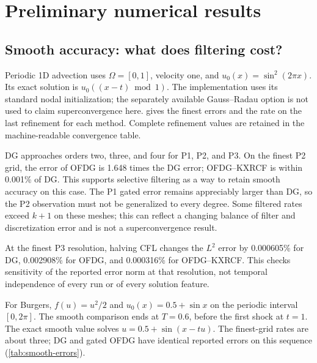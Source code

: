 \chapter{Preliminary numerical results}
\label{chap:experiments}


\section{Smooth accuracy: what does filtering cost?}
\label{sec:results-convergence-tables}
Periodic 1D advection uses $\Omega=[0,1]$, velocity one, and
$u_0(x)=\sin^2(2\pi x)$. Its exact solution is $u_0((x-t)\bmod1)$.
The implementation uses its standard nodal initialization; the separately
available Gauss--Radau option is not used to claim superconvergence here.
 gives the finest errors and the rate on the last
refinement for each method. Complete refinement values are retained in the
machine-readable convergence table.


DG approaches orders two, three, and four for P1, P2, and P3. On the finest P2
grid, the error of OFDG is 1.648 times the DG error; OFDG--KXRCF is within
0.001\% of DG. This supports selective filtering as a way to retain smooth
accuracy on this case. The P1 gated error remains appreciably larger than DG,
so the P2 observation must not be generalized to every degree. Some filtered
rates exceed $k+1$ on these meshes; this can reflect a changing balance of
filter and discretization error and is not a superconvergence result.

At the finest P3 resolution, halving CFL changes the $L^2$ error by 0.000605\%
for DG, 0.002908\% for OFDG, and 0.000316\% for OFDG--KXRCF. This checks
sensitivity of the reported error norm at that resolution, not temporal
independence of every run or of every solution feature.

For Burgers, $f(u)=u^2/2$ and $u_0(x)=0.5+\sin x$ on the periodic interval
$[0,2\pi]$. The smooth comparison ends at $T=0.6$, before the first shock at
$t=1$. The exact smooth value solves $u=0.5+\sin(x-tu)$.
The finest-grid rates are about three; DG and gated OFDG have identical
reported errors on this sequence (\cref{tab:smooth-errors}).

